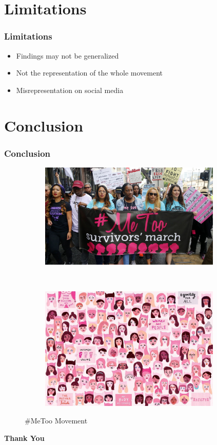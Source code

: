 \documentclass{beamer}
\begin{document}
	\section{Limitations}
	\begin{frame}
		\frametitle{Limitations}
		\begin{itemize}
			\item Findings may not be generalized \pause
			\item Not the representation of the whole movement \pause
			\item Misrepresentation on social media
		\end{itemize}
	\end{frame}
\section{Conclusion}
\begin{frame}
\frametitle{Conclusion}
\begin{figure}
	\centering
	\begin{subfigure}{0.45\textwidth}
		\includegraphics[width=0.95\textwidth]{pic1.jpg}
	\end{subfigure}
	~
	\begin{subfigure}{0.45\textwidth}
		\includegraphics[width=0.95\textwidth]{pic2.jpg}
	\end{subfigure}
	\caption{\#MeToo Movement}
	
\end{figure}

\end{frame}
\begin{frame}
\centering
	\textbf{\Huge Thank You}
\end{frame}
\end{document}
